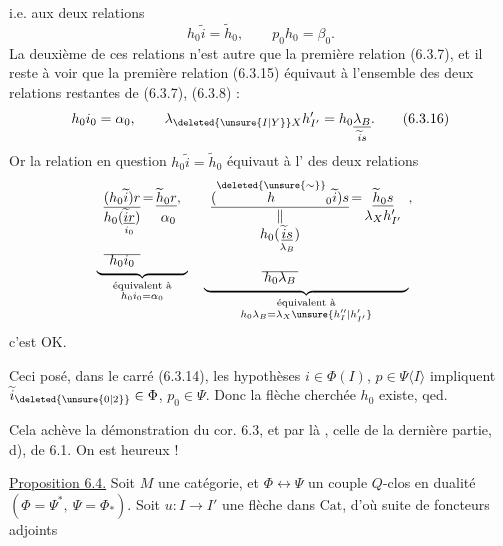 i.e. aux deux relations
\[
 h_0\widetilde i=\widetilde h_0,\qquad p_0h_0=\beta_0.\tag*{(6.3.15)}
\]
La deuxième de ces relations n'est autre que
la première relation (6.3.7), et il reste à
voir que  la première relation (6.3.15)
équivaut à l'ensemble des deux relations
restantes de (6.3.7), (6.3.8) :
\[
 h_0i_0=\alpha_0,\qquad \lambda_{\deleted{\unsure{I|Y}}X}h'_{I'}=h_0\underset{\widetilde i s}{\underline{\lambda_B}}.\tag*{(6.3.16)}
\]
Or la relation en question $h_0\widetilde i=\widetilde h_0$ équivaut
à l' des deux relations
\[
\begin{aligned}
&\underbrace{\begin{array}[t]{c@{\,}c@{\,}c}
 \underline{(h_0\widetilde i)r}&=&\underline{\widetilde h_0 r},\\
 h_0(\underset{i_0}{\underline{\widetilde i r}})&&\alpha_0\\
 \underline{\phantom{h_0(\widetilde i r)}}&&\\[-2pt]
 h_0i_0&&
\end{array}}_{\substack{\text{équivalent à}\\ h_0i_0=\alpha_0}}
\quad
\underbrace{\begin{array}[t]{c@{\,}c@{\,}c}
 \underline{(\overset{\deleted{\unsure{\sim}}}{h}_0\widetilde i)s}&=&\underline{\widetilde h_0 s}\\
 \Vert&&\lambda_Xh'_{I'}\\
 h_0(\underset{\lambda_B}{\underline{\widetilde i s}})&&\\
 \underline{\phantom{h_0(\widetilde i s)}}&&\\[-2pt]
 h_0\lambda_B&&
\end{array}}_{\substack{\text{équivalent à}\\ h_0\lambda_B=\lambda_X \unsure{h''_I|h'_{I'}}}},
\end{aligned}
\]
c'est OK.

Ceci posé, dans le carré (6.3.14), les
hypothèses $i\in\Phi(I)$, $p\in\Psi\langle I\rangle$ impliquent
$\widetilde i_{\deleted{\unsure{0|2}}}\in\Phi$, $p_0\in\Psi$. Donc la flèche cherchée
$h_0$ existe, qed.

Cela achève la démonstration du cor. 6.3,
et par là , celle de la dernière
partie, d), de 6.1. On est heureux !

\uline{Proposition 6.4.} Soit $M$ une catégorie,
et $\Phi\longleftrightarrow\Psi$ un couple $Q$-clos en 
dualité $(\Phi=\Psi^*,\ \Psi=\Phi_*)$. Soit
$u\colon I\longrightarrow I'$ une flèche dans $\mathrm{Cat}$, d'où
suite de foncteurs adjoints

